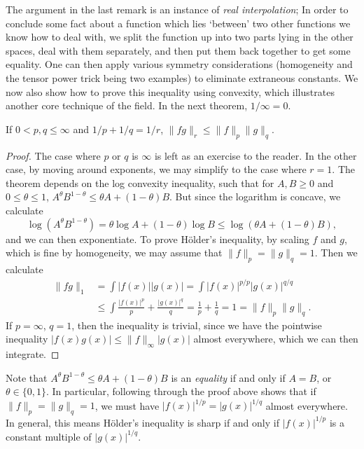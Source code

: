 The argument in the last remark is an instance of \emph{real interpolation}; In order to conclude some fact about a function which lies `between' two other functions we know how to deal with, we split the function up into two parts lying in the other spaces, deal with them separately, and then put them back together to get some equality. One can then apply various symmetry considerations (homogeneity and the tensor power trick being two examples) to eliminate extraneous constants. We now also show how to prove this inequality using convexity, which illustrates another core technique of the field. In the next theorem, $1/\infty = 0$.

\begin{theorem}[H\"{o}lder]
  If $0 < p,q \leq \infty$ and $1/p + 1/q = 1/r$, $\| f g \|_r \leq \| f \|_p \| g \|_q$.
\end{theorem}
\begin{proof}
  The case where $p$ or $q$ is $\infty$ is left as an exercise to the reader. In the other case, by moving around exponents, we may simplify to the case where $r = 1$. The theorem depends on the log convexity inequality, such that for $A,B \geq 0$ and $0 \leq \theta \leq 1$, $A^\theta B^{1 - \theta} \leq \theta A + (1 - \theta) B$. But since the logarithm is concave, we calculate
  \[ \log(A^\theta B^{1 - \theta}) = \theta \log A + (1 - \theta) \log B \leq \log(\theta A + (1 - \theta) B), \]
  and we can then exponentiate. To prove H\"{o}lder's inequality, by scaling $f$ and $g$, which is fine by homogeneity, we may assume that $\| f \|_p = \| g \|_q = 1$. Then we calculate
  \begin{align*}
    \| f g \|_1 &= \int |f(x)| |g(x)| = \int |f(x)|^{p/p} |g(x)|^{q/q}\\
    &\leq \int \frac{|f(x)|^p}{p} + \frac{|g(x)|^q}{q} = \frac{1}{p} + \frac{1}{q} = 1 = \| f \|_p \| g \|_q.
  \end{align*}
  If $p = \infty$, $q = 1$, then the inequality is trivial, since we have the pointwise inequality $|f(x) g(x)| \leq \| f \|_\infty |g(x)|$ almost everywhere, which we can then integrate.
\end{proof}

\begin{remark}
  Note that $A^\theta B^{1-\theta} \leq \theta A + (1 - \theta) B$ is an \emph{equality} if and only if $A = B$, or $\theta \in \{ 0, 1 \}$. In particular, following through the proof above shows that if $\| f \|_p = \| g \|_q = 1$, we must have $|f(x)|^{1/p} = |g(x)|^{1/q}$ almost everywhere. In general, this means H\"{o}lder's inequality is sharp if and only if $|f(x)|^{1/p}$ is a constant multiple of $|g(x)|^{1/q}$.
\end{remark}

